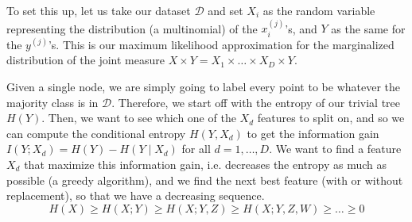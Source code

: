 \documentclass{article}
\theoremstyle{definition}
\begin{document}
  To set this up, let us take our dataset $\mathcal{D}$ and set $X_i$ as the random variable representing the distribution (a multinomial) of the $x_i^{(j)}$'s, and $Y$ as the same for the $y^{(j)}$'s. This is our maximum likelihood approximation for the marginalized distribution of the joint measure $X \times Y = X_1 \times \ldots \times X_D \times Y$. 

  Given a single node, we are simply going to label every point to be whatever the majority class is in $\mathcal{D}$. Therefore, we start off with the entropy of our trivial tree $H(Y)$. Then, we want to see which one of the $X_d$ features to split on, and so we can compute the conditional entropy $H(Y, X_d)$ to get the information gain $I(Y; X_d) = H(Y) - H(Y \mid X_d)$ for all $d = 1, \ldots, D$. We want to find a feature $X_d$ that maximize this information gain, i.e. decreases the entropy as much as possible (a greedy algorithm), and we find the next best feature (with or without replacement), so that we have a decreasing sequence. 
  \[H(X) \geq H(X ; Y) \geq H(X ; Y, Z) \geq H(X ; Y, Z, W) \geq \ldots \geq 0\]
\end{document}
